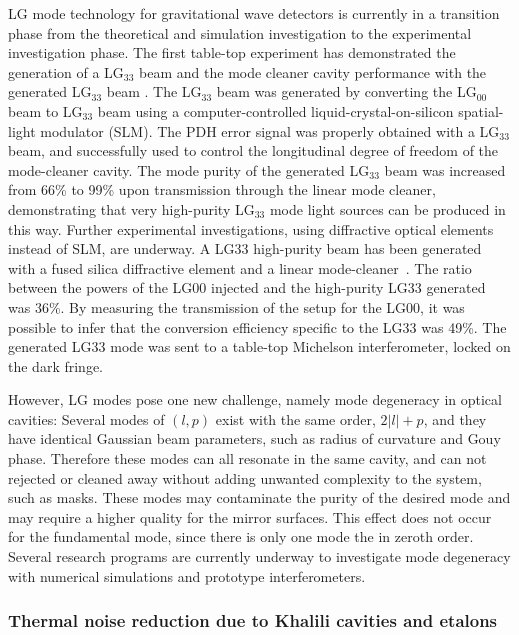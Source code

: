 LG mode technology for gravitational wave detectors
is currently in a transition phase from the theoretical
and simulation investigation to the experimental investigation phase.
The first table-top experiment has demonstrated the generation of a LG$_{33}$ beam
and the mode cleaner cavity performance with the generated LG$_{33}$ beam \cite{Fulda10}.
The LG$_{33}$ beam was generated by converting the LG$_{00}$ beam to LG$_{33}$ beam
using a computer-controlled liquid-crystal-on-silicon spatial-light modulator (SLM).
The PDH error signal was properly obtained with a LG$_{33}$ beam,
and successfully used to control the longitudinal
degree of freedom of the mode-cleaner cavity.
The mode purity of the generated LG$_{33}$ beam
was increased from 66\% to 99\% upon transmission through the linear mode
cleaner, demonstrating that very high-purity LG$_{33}$ mode
light sources can be produced in this way.
Further experimental investigations, using diffractive optical elements instead of SLM, are underway. A LG33 high-purity beam has been generated with a fused silica diffractive element and a linear mode-cleaner~\cite{Granata10}. The ratio between the powers of the LG00 injected and the high-purity LG33 generated was 36\%. By measuring the transmission of the setup for the LG00, it was possible to infer that the conversion efficiency specific to the LG33 was 49\%. The generated LG33 mode was sent to a table-top Michelson interferometer, locked on the dark fringe. 

However, LG modes pose one new challenge, namely mode degeneracy in 
optical cavities:
Several modes of $(l,p)$ exist with the same order, $2|l|+p$,
and they have identical Gaussian beam parameters, such as radius of curvature and Gouy phase.
Therefore these modes can all resonate in the same cavity,
and can not rejected or cleaned away without adding unwanted complexity to the system, 
such as masks. These modes may contaminate the purity of the desired mode
and may require a higher quality for the mirror surfaces.
This effect does not occur for the fundamental mode, since there is only one mode the in zeroth order. Several research programs are currently underway to investigate 
mode degeneracy with numerical simulations and prototype interferometers.

\FloatBarrier
\subsubsection{Thermal noise reduction due to Khalili cavities and etalons}
\label{sec:khalili}


